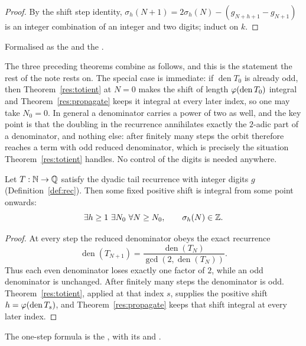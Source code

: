 \documentclass[11pt]{article}
\begin{document}
\begin{proof}
By the shift step identity, $\sigma_h(N+1)=2\sigma_h(N)-(g_{N+h+1}-g_{N+1})$ is
an integer combination of an integer and two digits; induct on $k$.
\end{proof}

\noindent Formalised as the
 and the
.

The three preceding theorems combine as follows, and this is the statement the
rest of the note rests on.  The special case is immediate: if
$\operatorname{den}T_0$ is already odd, then Theorem~\ref{res:totient} at
$N=0$ makes the shift of length $\varphi(\operatorname{den}T_0)$ integral and
Theorem~\ref{res:propagate} keeps it integral at every later index, so one may
take $N_0=0$.  In general a denominator carries a power of two as well, and the
key point is that the doubling in the recurrence annihilates
exactly the $2$-adic part of a denominator, and nothing else: after finitely
many steps the orbit therefore reaches a term with odd reduced denominator,
which is precisely the situation Theorem~\ref{res:totient} handles.  No
control of the digits is needed anywhere.

\begin{theorem}\label{res:collapse}
Let $T:\mathbb{N}\to\mathbb{Q}$ satisfy the dyadic tail recurrence with integer digits $g$
(Definition~\ref{def:rec}).  Then some fixed positive shift is integral from
some point onwards:
\[
 \exists h\ge1\ \exists N_0\ \forall N\ge N_0,\qquad
 \sigma_h(N)\in\mathbb{Z} .
\]
\end{theorem}

\begin{proof}
At every step the reduced denominator obeys the exact recurrence
\[
 \operatorname{den}(T_{N+1})
 =\frac{\operatorname{den}(T_N)}{\gcd(2,\operatorname{den}(T_N))}.
\]
Thus each even denominator loses exactly one factor of $2$, while an odd
denominator is unchanged.  After finitely many steps the denominator is odd.
Theorem~\ref{res:totient}, applied at that index $s$, supplies
the positive shift $h=\varphi(\operatorname{den}T_s)$, and
Theorem~\ref{res:propagate} keeps that shift integral at every later index.
\end{proof}

\noindent The one-step formula is the
,
with its
and
.
\end{document}
